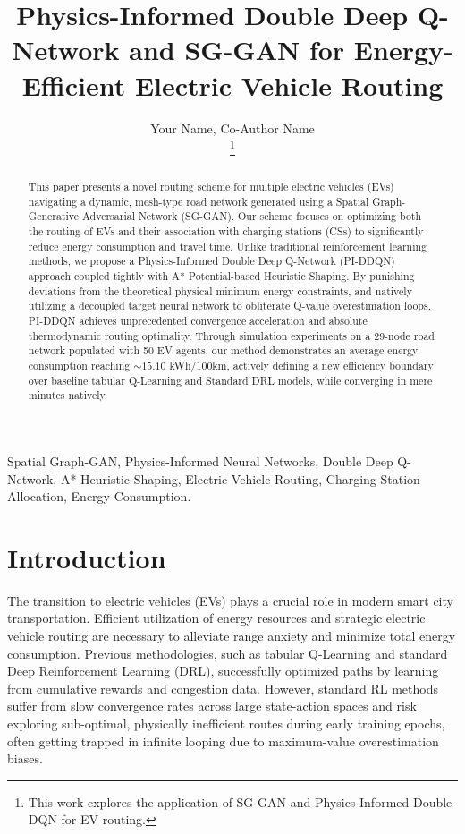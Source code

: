\documentclass[journal]{IEEEtran}
\begin{document}
\title{Physics-Informed Double Deep Q-Network and SG-GAN for Energy-Efficient Electric Vehicle Routing}

\author{Your Name, Co-Author Name \\
\thanks{This work explores the application of SG-GAN and Physics-Informed Double DQN for EV routing.}}

\maketitle

\begin{abstract}
This paper presents a novel routing scheme for multiple electric vehicles (EVs) navigating a dynamic, mesh-type road network generated using a Spatial Graph-Generative Adversarial Network (SG-GAN). Our scheme focuses on optimizing both the routing of EVs and their association with charging stations (CSs) to significantly reduce energy consumption and travel time. Unlike traditional reinforcement learning methods, we propose a Physics-Informed Double Deep Q-Network (PI-DDQN) approach coupled tightly with A* Potential-based Heuristic Shaping. By punishing deviations from the theoretical physical minimum energy constraints, and natively utilizing a decoupled target neural network to obliterate Q-value overestimation loops, PI-DDQN achieves unprecedented convergence acceleration and absolute thermodynamic routing optimality. Through simulation experiments on a 29-node road network populated with 50 EV agents, our method demonstrates an average energy consumption reaching $\sim 15.10$ kWh/100km, actively defining a new efficiency boundary over baseline tabular Q-Learning and Standard DRL models, while converging in mere minutes natively.
\end{abstract}

\begin{IEEEkeywords}
Spatial Graph-GAN, Physics-Informed Neural Networks, Double Deep Q-Network, A* Heuristic Shaping, Electric Vehicle Routing, Charging Station Allocation, Energy Consumption.
\end{IEEEkeywords}

\section{Introduction}
The transition to electric vehicles (EVs) plays a crucial role in modern smart city transportation. Efficient utilization of energy resources and strategic electric vehicle routing are necessary to alleviate range anxiety and minimize total energy consumption. Previous methodologies, such as tabular Q-Learning and standard Deep Reinforcement Learning (DRL), successfully optimized paths by learning from cumulative rewards and congestion data. However, standard RL methods suffer from slow convergence rates across large state-action spaces and risk exploring sub-optimal, physically inefficient routes during early training epochs, often getting trapped in infinite looping due to maximum-value overestimation biases. 
\end{document}
